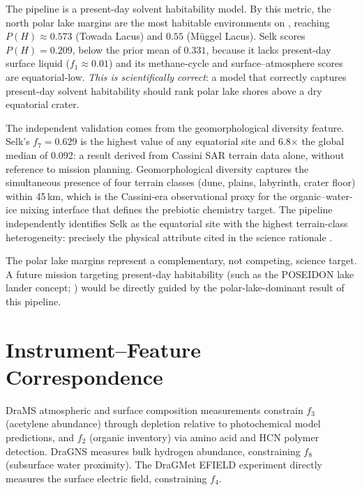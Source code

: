 The pipeline is a present-day solvent habitability model.  By this
metric, the north polar lake margins are the most habitable environments
on \titan{}, reaching $P(H) \approx 0.573$ (Towada Lacus) and
$0.55$ (Müggel Lacus).  Selk scores $P(H) = 0.209$, below the
prior mean of $0.331$, because it lacks present-day surface liquid
($f_1 \approx 0.01$) and its methane-cycle and surface--atmosphere scores
are equatorial-low.  \textit{This is scientifically correct}: a model that
correctly captures present-day solvent habitability should rank polar lake
shores above a dry equatorial crater.

The independent validation comes from the geomorphological diversity
feature.  Selk's $f_7 = 0.629$ is the highest value of any equatorial
site and 6.8$\times$ the global median of 0.092: a result derived from
Cassini SAR terrain data alone, without reference to mission planning.
Geomorphological diversity captures the simultaneous presence of four
terrain classes (dune, plains, labyrinth, crater floor) within 45\,km,
which is the Cassini-era observational proxy for the organic--water-ice
mixing interface that defines the prebiotic chemistry target.  The
pipeline independently identifies Selk as the equatorial site with the
highest terrain-class heterogeneity: precisely the physical attribute
cited in the \dragonfly{} science rationale
\citep{Lorenz2021Landing, Neish2018}.

The polar lake margins represent a complementary, not competing, science
target.  A future mission targeting present-day habitability (such as
the POSEIDON lake lander concept; \citealt{Tosi2022POSEIDON}) would be
directly guided by the polar-lake-dominant result of this pipeline.

\section{Instrument--Feature Correspondence}
\label{sec:instruments}

DraMS atmospheric and surface composition measurements constrain $f_3$ (acetylene abundance) through depletion relative to photochemical model predictions, and $f_2$ (organic inventory) via amino acid and HCN polymer detection.  DraGNS measures bulk hydrogen abundance, constraining $f_8$ (subsurface water proximity).  The DraGMet EFIELD experiment directly measures the surface electric field, constraining $f_4$.

